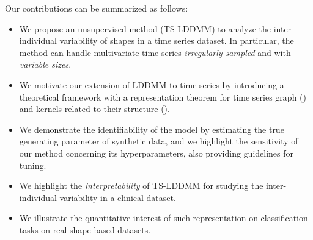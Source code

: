 
        
    Our contributions can be summarized as follows:
    \begin{itemize}
       \item We propose an unsupervised method (TS-LDDMM) to analyze the inter-individual variability of shapes in a time series dataset. In particular, the method can handle multivariate time series \textit{irregularly sampled} and with \textit{variable sizes}.
       \item We motivate our extension of LDDMM to time series by introducing a theoretical framework with a representation theorem for time series graph () and kernels related to their structure ().
       \item We demonstrate the identifiability of the model by estimating the true generating parameter of synthetic data, and we highlight the sensitivity of our method concerning its hyperparameters, also providing guidelines for tuning.
       \item We highlight the \textit{interpretability} of TS-LDDMM for studying the inter-individual variability in a clinical dataset.
        \item We illustrate the quantitative interest of such representation on classification tasks on real shape-based datasets.
 \end{itemize}

